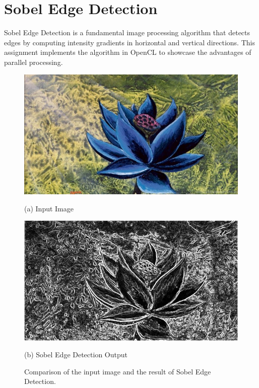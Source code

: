 \documentclass{article}
\begin{document}
\section*{Sobel Edge Detection}

Sobel Edge Detection is a fundamental image processing algorithm that detects edges by computing intensity gradients
in horizontal and vertical directions. This assignment implements the algorithm in 
OpenCL to showcase the advantages of parallel processing.

\begin{figure}[h!]
\captionsetup[subfigure]{labelformat=empty}
    \centering
    \begin{minipage}{0.45\textwidth}
        \centering
        \includegraphics[width=\textwidth]{./images/input_blacklotus.jpg} %
        \caption*{(a) Input Image}
    \end{minipage}
    \hfill
    \begin{minipage}{0.45\textwidth}
        \centering
        \includegraphics[width=\textwidth]{./images/output_blacklotus.jpg} %
        \caption*{(b) Sobel Edge Detection Output}
    \end{minipage}
    \caption{Comparison of the input image and the result of Sobel Edge Detection.}
    \label{fig:sobel_comparison}
\end{figure}
\end{document}
